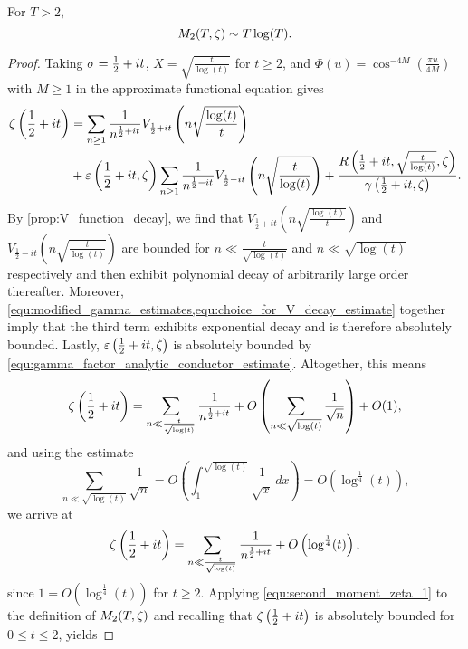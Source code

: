     \begin{theorem}\label{thm:second_moment_of_Riemann_zeta}
      For $T > 2$,
      \[
        M_{2}(T,\zeta) \sim T\log(T).
      \]
    \end{theorem}
    \begin{proof}
      Taking $\sigma = \frac{1}{2}+it$, $X = \sqrt{\frac{t}{\log(t)}}$ for $t \ge 2$, and $\Phi(u) = \cos^{-4M}\left(\frac{\pi u}{4M}\right)$ with $M \ge 1$ in the approximate functional equation gives
      \begin{align*}
        \zeta\left(\frac{1}{2}+it\right) &= \sum_{n \ge 1}\frac{1}{n^{\frac{1}{2}+it}}V_{\frac{1}{2}+it}\left(n\sqrt{\frac{\log(t)}{t}}\right) \\
        &+ \varepsilon\left(\frac{1}{2}+it,\zeta\right)\sum_{n \ge 1}\frac{1}{n^{\frac{1}{2}-it}}V_{\frac{1}{2}-it}\left(n\sqrt{\frac{t}{\log(t)}}\right)+\frac{R\left(\frac{1}{2}+it,\sqrt{\frac{t}{\log(t)}},\zeta\right)}{\gamma\left(\frac{1}{2}+it,\zeta\right)}.
      \end{align*}
      By \cref{prop:V_function_decay}, we find that $V_{\frac{1}{2}+it}\left(n\sqrt{\frac{\log(t)}{t}}\right)$ and $V_{\frac{1}{2}-it}\left(n\sqrt{\frac{t}{\log(t)}}\right)$ are bounded for $n \ll \frac{t}{\sqrt{\log(t)}}$ and $n \ll \sqrt{\log(t)}$ respectively and then exhibit polynomial decay of arbitrarily large order thereafter. Moreover, \cref{equ:modified_gamma_estimates,equ:choice_for_V_decay_estimate} together imply that the third term exhibits exponential decay and is therefore absolutely bounded. Lastly, $\varepsilon\left(\frac{1}{2}+it,\zeta\right)$ is absolutely bounded by \cref{equ:gamma_factor_analytic_conductor_estimate}. Altogether, this means
      \[
        \zeta\left(\frac{1}{2}+it\right) = \sum_{n \ll \frac{t}{\sqrt{\log(t)}}}\frac{1}{n^{\frac{1}{2}+it}}+O\left(\sum_{n \ll \sqrt{\log(t)}}\frac{1}{\sqrt{n}}\right)+O(1),
      \]
      and using the estimate
      \[
        \sum_{n \ll \sqrt{\log(t)}}\frac{1}{\sqrt{n}} = O\left(\int_{1}^{\sqrt{\log(t)}}\frac{1}{\sqrt{x}}\,dx\right) = O\left(\log^{\frac{1}{4}}(t)\right),
      \]
      we arrive at
      \begin{equation}\label{equ:second_moment_zeta_1}
        \zeta\left(\frac{1}{2}+it\right) = \sum_{n \ll \frac{t}{\sqrt{\log(t)}}}\frac{1}{n^{\frac{1}{2}+it}}+O\left(\log^{\frac{1}{4}}(t)\right),
      \end{equation}
      since $1 = O(\log^{\frac{1}{4}}(t))$ for $t \ge 2$. Applying \cref{equ:second_moment_zeta_1} to the definition of $M_{2}(T,\zeta)$ and recalling that $\zeta\left(\frac{1}{2}+it\right)$ is absolutely bounded for $0 \le t \le 2$, yields

\end{proof}
